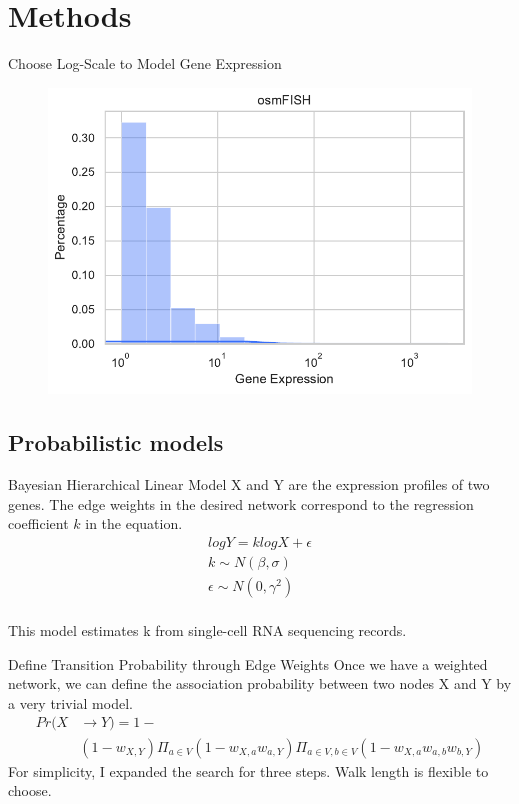 \documentclass[handout,t]{beamer}
\begin{document}

\section{Methods}

\begin{frame}{Choose Log-Scale to Model Gene Expression}
\begin{figure}
\includegraphics[width=0.7\columnwidth]{../figure/dist/osmFISH.pdf}
\end{figure}
\end{frame}

\subsection{Probabilistic models}
\begin{frame}{Bayesian Hierarchical Linear Model}
X and Y are the expression profiles of two genes. The edge weights in the desired network correspond to the regression coefficient $k$ in the equation.
\begin{equation}
    \begin{array}{ll}
            logY = k logX +\epsilon\\
            k \sim N(\beta, \sigma)\\
            \epsilon \sim N(0, \gamma^2)\\
    \end{array}
\end{equation}

This model estimates k from single-cell RNA sequencing records.
\end{frame}

\begin{frame}{Define Transition Probability through Edge Weights}
Once we have a weighted network, we can define the association probability between two nodes X and Y by a very trivial model.
\begin{equation}\begin{split}
   Pr(X& \rightarrow Y) = 1-\\
   &(1-w_{X, Y})\Pi_{a\in V}(1-w_{X, a}w_{a, Y})\Pi_{a\in V, b\in V}(1-w_{X, a}w_{a, b}w_{b, Y})
\end{split}\end{equation}
For simplicity, I expanded the search for three steps. Walk length is flexible to choose.
\end{frame}
\end{document}
